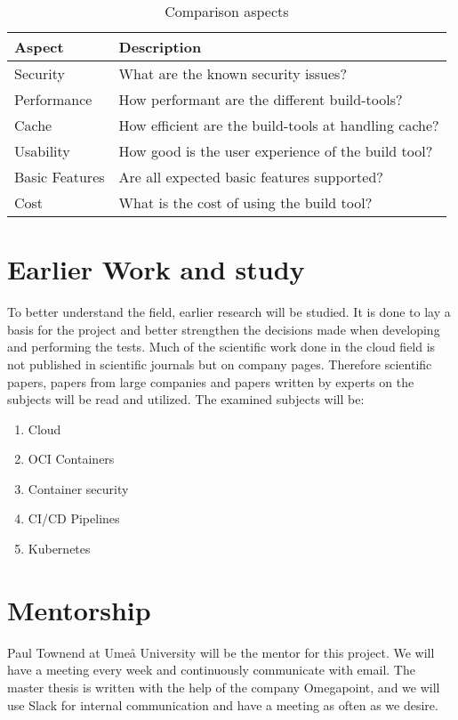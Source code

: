 \begin{table}[h!]
    \centering
    \begin{tabular}{l|l}
        \textbf{Aspect} & \textbf{Description} \\
        \hline
        Security & What are the known security issues?\\
        \hline
        Performance & How performant are the different build-tools?\\
        \hline
        Cache & How efficient are the build-tools at handling cache?\\
        \hline
        Usability & How good is the user experience of the build tool?\\
        \hline
        Basic Features & Are all expected basic features supported?\\
        \hline
        Cost & What is the cost of using the build tool? \\
    \end{tabular}
    \caption{Comparison aspects}
    \label{tab:aspects}
\end{table}

\section{Earlier Work and study}
To better understand the field, earlier research will be studied. It is done to lay a basis for the project and better strengthen the decisions made when developing and performing the tests. Much of the scientific work done in the cloud field is not published in scientific journals but on company pages. Therefore scientific papers, papers from large companies and papers written by experts on the subjects will be read and utilized. The examined subjects will be:

\begin{enumerate}
    \item Cloud
    \item OCI Containers
    \item Container security
    \item CI/CD Pipelines
    \item Kubernetes
\end{enumerate}

\section{Mentorship}
Paul Townend at Umeå University will be the mentor for this project. We will have a meeting every week and continuously communicate with email. The master thesis is written with the help of the company Omegapoint, and we will use Slack for internal communication and have a meeting as often as we desire. 

